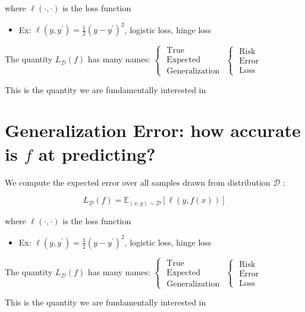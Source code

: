 where $\ell(\cdot, \cdot)$ is the loss function

\begin{itemize}
  \item Ex: $\ell\left(y, y^{\prime}\right)=\frac{1}{2}\left(y-y^{\prime}\right)^{2}$, logistic loss, hinge loss
\end{itemize}

The quantity $L_{\mathscr{D}}(f)$ has many names: $\left\{\begin{array}{l}\text { True } \\ \text { Expected } \\ \text { Generalization }\end{array}\left\{\begin{array}{l}\text { Risk } \\ \text { Error } \\ \text { Loss }\end{array}\right.\right.$

This is the quantity we are fundamentally interested in

\section*{Generalization Error: how accurate is $f$ at predicting?}
We compute the expected error over all samples drawn from distribution $\mathscr{D}$ :

$$
L_{\mathscr{D}}(f)=\mathbb{E}_{(x, y) \sim \mathscr{D}}[\ell(y, f(x))]
$$

where $\ell(\cdot, \cdot)$ is the loss function

\begin{itemize}
  \item Ex: $\ell\left(y, y^{\prime}\right)=\frac{1}{2}\left(y-y^{\prime}\right)^{2}$, logistic loss, hinge loss
\end{itemize}

The quantity $L_{\mathscr{D}}(f)$ has many names: $\left\{\begin{array}{l}\text { True } \\ \text { Expected } \\ \text { Generalization }\end{array}\left\{\begin{array}{l}\text { Risk } \\ \text { Error } \\ \text { Loss }\end{array}\right.\right.$

This is the quantity we are fundamentally interested in

